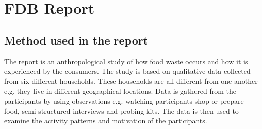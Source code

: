 \section{FDB Report}
\subsection{Method used in the report}
The report is an anthropological study of how food waste occurs and how it is experienced by the consumers. The study is based on qualitative data collected from six different households. These households are all different from one another e.g. they live in different geographical locations. Data is gathered from the participants by using observations e.g. watching participants shop or prepare food, semi-structured interviews and probing kits. The data is then used to examine the activity patterns and motivation of the participants. 

